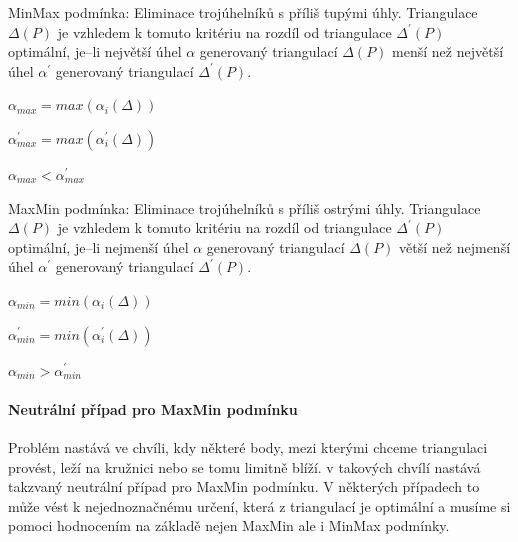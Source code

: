 \documentclass[12pt,a4paper]{article}
\begin{document}
\newpage
{}
MinMax podmínka:
Eliminace trojúhelníků s příliš tupými úhly. Triangulace $\Delta(P)$ je vzhledem k tomuto kritériu na rozdíl od triangulace $\Delta^{'}(P)$ optimální, je–li největší úhel $\alpha$ generovaný triangulací $\Delta(P)$ menší než největší úhel $\alpha^{'}$ generovaný triangulací $\Delta^{'}(P)$.

$\alpha_{max} = max(\alpha_i(\Delta))$

$\alpha^{'}_{max} = max(\alpha_i^{'}(\Delta))$

$\alpha_{max} < \alpha^{'}_{max}$

\bigskip
MaxMin podmínka:
Eliminace trojúhelníků s příliš ostrými úhly. Triangulace $\Delta(P)$ je vzhledem k tomuto kritériu na rozdíl od triangulace $\Delta^{'}(P)$ optimální, je–li nejmenší úhel $\alpha$ generovaný triangulací $\Delta(P)$ větší než nejmenší úhel $\alpha^{'}$ generovaný triangulací $\Delta^{'}(P)$.

$\alpha_{min} = min(\alpha_i(\Delta))$

$\alpha^{'}_{min} = min(\alpha_i^{'}(\Delta))$

$\alpha_{min} > \alpha^{'}_{min}$

\paragraph{Neutrální případ pro MaxMin podmínku}

Problém nastává ve chvíli, kdy některé body, mezi kterými chceme triangulaci provést, leží na kružnici nebo se tomu limitně blíží. v takových chvílí nastává takzvaný neutrální případ pro MaxMin podmínku. V některých případech to může vést k nejednoznačnému určení, která z triangulací je optimální a musíme si pomoci hodnocením na základě nejen MaxMin ale i MinMax podmínky.
\end{document}
